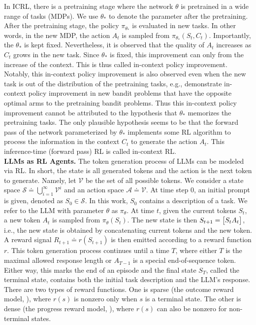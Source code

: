 \documentclass{article}
\newcommand{\fS}{\mathcal{S}}
\newcommand{\fA}{\mathcal{A}}
\newcommand{\fV}{\mathcal{V}}
\newcommand{\0}{\mathbf{0}}
\begin{document}
In ICRL,
there is a pretraining stage where the network $\theta$ is pretrained in a wide range of tasks (MDPs).
We use $\theta_*$ to denote the parameter after the pretraining.
After the pretraining stage,
the policy $\pi_{\theta_*}$ is evaluated in new tasks.
In other words,
in the new MDP, the action $A_t$ is sampled from $\pi_{\theta_*}(S_t, C_t)$.
Importantly, the $\theta_*$ is kept fixed.
Nevertheless,
it is observed that the quality of $A_t$ increases as $C_t$ grows in the new task.
Since $\theta_*$ is fixed,
this improvement can only from the increase of the context.
This is thus called in-context policy improvement.
Notably,
this in-context policy improvement is also observed even when the new task is out of the distribution of the pretraining tasks,
e.g.,
\citet{laskin2023incontext} demonstrate in-context policy improvement in new bandit problems that have the opposite optimal arms to the pretraining bandit problems.
Thus this in-context policy improvement cannot be attributed to the hypothesis that $\theta_*$ memorizes the pretraining tasks.
The only plausible hypothesis seems to be that the forward pass of the network parameterized by $\theta_*$ implements some RL algorithm to process the information in the context $C_t$ to generate the action $A_t$.
This inference-time (forward pass) RL is called in-context RL. \\
\textbf{LLMs as RL Agents.} The token generation process of LLMs can be modeled via RL.
In short, the state is all generated tokens and the action is the next token to generate.
Namely,
let $\fV$ be the set of all possible tokens.
We consider a state space $\fS \doteq \bigcup_{i=1}^\infty \fV^i$ and an action space $\fA \doteq \fV$.
At time step 0, an initial prompt is given, denoted as $S_0 \in \fS$.
In this work,
$S_0$ contains a description of a task.
We refer to the LLM with parameter $\theta$ as $\pi_\theta$.
At time $t$,
given the current tokens $S_t$,
a new token $A_t$ is sampled from $\pi_\theta(S_t)$.
The new state is then $S_{t+1} = \mqty[S_t A_t]$, i.e.,
the new state is obtained by concatenating current tokens and the new token.
A reward signal $R_{t+1} \doteq r(S_{t+1})$ is then emitted according to a reward function $r$.
This token generation process continues until a time $T$,
where either $T$ is the maximal allowed response length or $A_{T-1}$ is a special end-of-sequence token.
Either way,
this marks the end of an episode
and the final state $S_T$, called the terminal state, contains both the initial task description and the LLM's response.
There are two types of reward functions.
One is sparse (the outcome reward model, \citet{ouyang2022training}),
where $r(s)$ is nonzero only when $s$ is a terminal state.
The other is dense (the progress reward model, \citet{lightman2023lets}),
where $r(s)$ can also be nonzero for non-terminal states.
\end{document}
